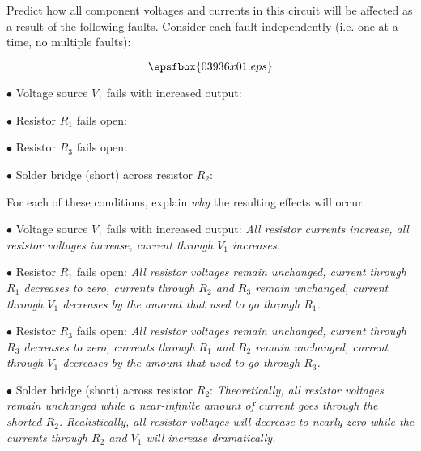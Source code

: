 

Predict how all component voltages and currents in this circuit will be affected as a result of the following faults.  Consider each fault independently (i.e. one at a time, no multiple faults):

$$\epsfbox{03936x01.eps}$$

\medskip
\item{$\bullet$} Voltage source $V_1$ fails with increased output:
\vskip 5pt
\item{$\bullet$} Resistor $R_1$ fails open: 
\vskip 5pt
\item{$\bullet$} Resistor $R_3$ fails open: 
\vskip 5pt
\item{$\bullet$} Solder bridge (short) across resistor $R_2$: 
\medskip

For each of these conditions, explain {\it why} the resulting effects will occur.







\medskip
\item{$\bullet$} Voltage source $V_1$ fails with increased output: {\it All resistor currents increase, all resistor voltages increase, current through $V_1$ increases.}
\vskip 5pt
\item{$\bullet$} Resistor $R_1$ fails open: {\it All resistor voltages remain unchanged, current through $R_1$ decreases to zero, currents through $R_2$ and $R_3$ remain unchanged, current through $V_1$ decreases by the amount that used to go through $R_1$.}
\vskip 5pt
\item{$\bullet$} Resistor $R_3$ fails open: {\it All resistor voltages remain unchanged, current through $R_3$ decreases to zero, currents through $R_1$ and $R_2$ remain unchanged, current through $V_1$ decreases by the amount that used to go through $R_3$.}
\vskip 5pt
\item{$\bullet$} Solder bridge (short) across resistor $R_2$: {\it Theoretically, all resistor voltages remain unchanged while a near-infinite amount of current goes through the shorted $R_2$.  Realistically, all resistor voltages will decrease to nearly zero while the currents through $R_2$ and $V_1$ will increase dramatically.}
\medskip


